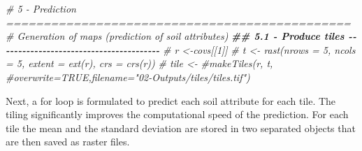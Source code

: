 \documentclass[
  10pt,
  b5paper,
  oneside]{book}
\newenvironment{Shaded}{\begin{snugshade}}{\end{snugshade}}
\newcommand{\CommentTok}[1]{\textcolor[rgb]{0.56,0.35,0.01}{\textit{#1}}}
\newcommand{\DocumentationTok}[1]{\textcolor[rgb]{0.56,0.35,0.01}{\textbf{\textit{#1}}}}
\begin{document}
\begin{Shaded}
\begin{Highlighting}[]
\CommentTok{\# 5 {-} Prediction ==============================================}
\CommentTok{\# Generation of maps (prediction of soil attributes) }
\DocumentationTok{\#\# 5.1 {-} Produce tiles {-}{-}{-}{-}{-}{-}{-}{-}{-}{-}{-}{-}{-}{-}{-}{-}{-}{-}{-}{-}{-}{-}{-}{-}{-}{-}{-}{-}{-}{-}{-}{-}{-}{-}{-}{-}{-}{-}{-}{-}}
\CommentTok{\# r \textless{}{-}covs[[1]]}
\CommentTok{\# t \textless{}{-} rast(nrows = 5, ncols = 5, extent = ext(r), crs = crs(r))}
\CommentTok{\# tile \textless{}{-}}
\CommentTok{\#makeTiles(r, t,}
\CommentTok{\#overwrite=TRUE,filename="02{-}Outputs/tiles/tiles.tif")}
\end{Highlighting}
\end{Shaded}

Next, a for loop is formulated to predict each soil attribute for each tile. The tiling significantly improves the computational speed of the prediction. For each tile the mean and the standard deviation are stored in two separated objects that are then saved as raster files.
\end{document}
